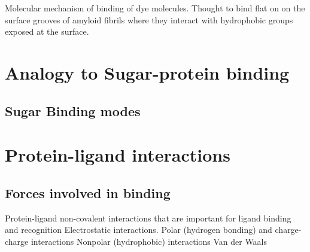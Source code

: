 
Molecular mechanism of binding of dye molecules. Thought to bind flat on on the surface grooves of amyloid fibrils where they interact with hydrophobic groups exposed at the surface. 

\section{Analogy to Sugar-protein binding}


\subsection{Sugar Binding modes}

\section{Protein-ligand interactions}
\subsection{Forces involved in binding}
\begin{outline}
	\1 Protein-ligand non-covalent interactions that are important for ligand binding and recognition
		\2 Electrostatic interactions. Polar (hydrogen bonding) and charge-charge interactions
		\2 Nonpolar (hydrophobic) interactions
		  \3 Van der Waals
\end{outline}

